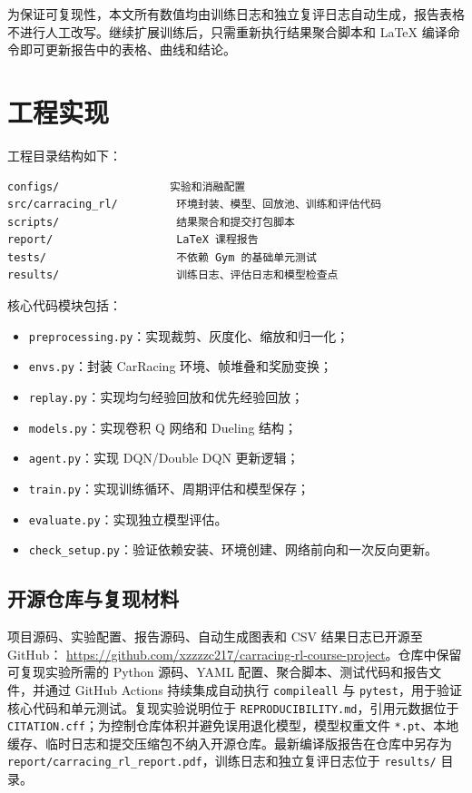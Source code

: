 \documentclass[UTF8,a4paper,12pt]{ctexart}
\begin{document}
为保证可复现性，本文所有数值均由训练日志和独立复评日志自动生成，报告表格不进行人工改写。继续扩展训练后，只需重新执行结果聚合脚本和 LaTeX 编译命令即可更新报告中的表格、曲线和结论。

\section{工程实现}

工程目录结构如下：

\begin{lstlisting}
configs/                 实验和消融配置
src/carracing_rl/         环境封装、模型、回放池、训练和评估代码
scripts/                  结果聚合和提交打包脚本
report/                   LaTeX 课程报告
tests/                    不依赖 Gym 的基础单元测试
results/                  训练日志、评估日志和模型检查点
\end{lstlisting}

核心代码模块包括：

\begin{itemize}
  \item \texttt{preprocessing.py}：实现裁剪、灰度化、缩放和归一化；
  \item \texttt{envs.py}：封装 CarRacing 环境、帧堆叠和奖励变换；
  \item \texttt{replay.py}：实现均匀经验回放和优先经验回放；
  \item \texttt{models.py}：实现卷积 Q 网络和 Dueling 结构；
  \item \texttt{agent.py}：实现 DQN/Double DQN 更新逻辑；
  \item \texttt{train.py}：实现训练循环、周期评估和模型保存；
  \item \texttt{evaluate.py}：实现独立模型评估。
  \item \texttt{check\_setup.py}：验证依赖安装、环境创建、网络前向和一次反向更新。
\end{itemize}

\subsection{开源仓库与复现材料}

项目源码、实验配置、报告源码、自动生成图表和 CSV 结果日志已开源至 GitHub：
\url{https://github.com/xzzzzc217/carracing-rl-course-project}。仓库中保留可复现实验所需的 Python 源码、YAML 配置、聚合脚本、测试代码和报告文件，并通过 GitHub Actions 持续集成自动执行 \texttt{compileall} 与 \texttt{pytest}，用于验证核心代码和单元测试。复现实验说明位于 \texttt{REPRODUCIBILITY.md}，引用元数据位于 \texttt{CITATION.cff}；为控制仓库体积并避免误用退化模型，模型权重文件 \texttt{*.pt}、本地缓存、临时日志和提交压缩包不纳入开源仓库。最新编译版报告在仓库中另存为 \texttt{report/carracing\_rl\_report.pdf}，训练日志和独立复评日志位于 \texttt{results/} 目录。
\end{document}
